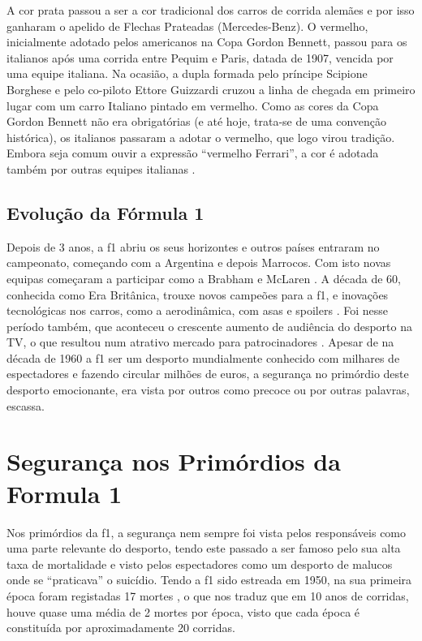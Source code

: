 \documentclass{report}
\begin{document}
 A cor prata passou a ser a cor tradicional dos carros de corrida alemães e por isso ganharam o apelido de Flechas Prateadas (Mercedes-Benz).
 O vermelho, inicialmente adotado pelos americanos na Copa Gordon Bennett, passou para os italianos após uma corrida entre Pequim e Paris, datada de 1907, vencida por uma equipe italiana. Na ocasião, a dupla formada pelo príncipe Scipione Borghese e pelo co-piloto Ettore Guizzardi cruzou a linha de chegada em primeiro lugar com um carro Italiano pintado em vermelho. Como as cores da Copa Gordon Bennett não era obrigatórias (e até hoje, trata-se de uma convenção histórica), os italianos passaram a adotar o vermelho, que logo virou tradição. Embora seja comum ouvir a expressão “vermelho Ferrari”, a cor é adotada também por outras equipes italianas \cite{cores}.\\[1cm]

\section{Evolução da Fórmula 1}

Depois de 3 anos, a \ac{f1} abriu os seus horizontes e outros países entraram no campeonato, começando com a Argentina e depois Marrocos. Com isto novas equipas começaram a participar como a Brabham e McLaren \cite{evolucao}.
 A década de 60, conhecida como Era Britânica, trouxe novos campeões para a \ac{f1}, e inovações tecnológicas nos carros, como a aerodinâmica, com asas e spoilers \cite{evolucao}. Foi nesse período também, que aconteceu o crescente aumento de audiência do desporto na TV, o que resultou num atrativo mercado para patrocinadores \cite{tv}.
Apesar de na década de 1960 a \ac{f1} ser um desporto mundialmente conhecido com milhares de espectadores e fazendo circular milhões de euros, a segurança no primórdio deste desporto emocionante, era vista por outros como precoce ou por outras palavras, escassa.  

\chapter{Segurança nos Primórdios da Formula 1 }

    Nos primórdios da \ac{f1}, a segurança nem sempre foi vista pelos responsáveis como uma parte relevante do desporto, tendo este passado a ser famoso pelo sua alta taxa de mortalidade e visto pelos espectadores como um desporto de malucos onde se “praticava” o suicídio.	 Tendo a \ac{f1} sido estreada em 1950, na sua primeira época foram registadas 17 mortes \cite{acidentes}, o que nos traduz que em 10 anos de corridas, houve quase uma média de 2 mortes por época, visto que cada época é constituída por aproximadamente 20 corridas.
\end{document}
